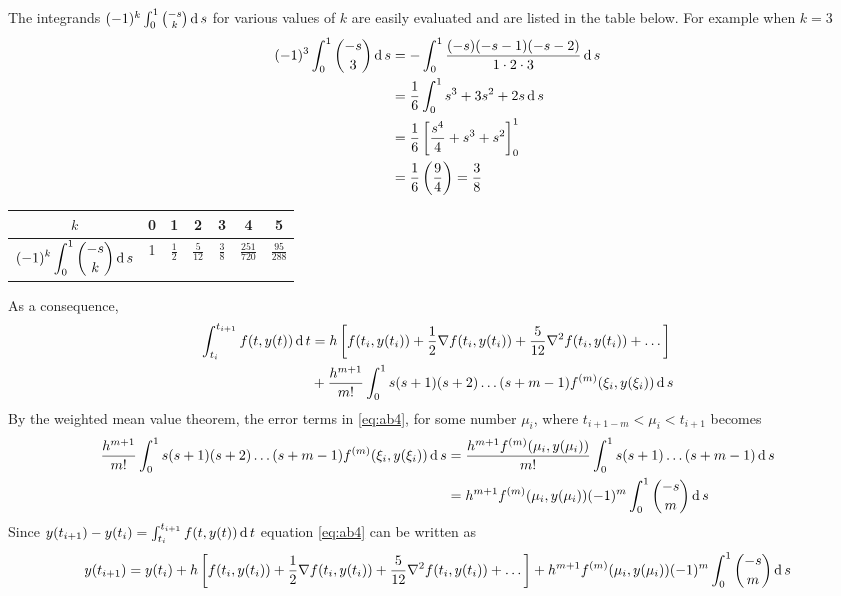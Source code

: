 \documentclass[../main-sheet.tex]{subfiles}
\begin{document}
The integrands \((-1)^k\int_{0}^{1}\binom{-s}{k}\,\mathrm{d}\, s\) for various values of \(k\) are easily evaluated and are listed in the table below. For example when \(k=3\)
\begin{align*}
    (-1)^3\int_{0}^{1}\binom{-s}{3}\,\mathrm{d}\, s&=-\int_{0}^{1}\frac{(-s)(-s-1)(-s-2)}{1\cdot2\cdot3}\,\mathrm{d}\, s\\
    &=\frac{1}{6}\int_{0}^{1} s^3+3s^2+2s \,\mathrm{d}\, s\\
    &=\frac{1}{6}\left[ \frac{s^4}{4}+s^3+s^2\right]_0^1\\
    &=\frac{1}{6}\left( \frac{9}{4} \right)=\frac{3}{8}
\end{align*}
\begin{table}[H]
    \centering
    \begin{tabular}{ccccccc}
        \toprule
        \(k\) & 0 & 1& 2& 3& 4&5\\\midrule
        \(\displaystyle (-1)^k\int_{0}^{1}\binom{-s}{k}\,\mathrm{d}\, s\) & 1 & \(\displaystyle\frac{1}{2}\)& \(\displaystyle\frac{5}{12}\)& \(\displaystyle\frac{3}{8}\)& \(\displaystyle\frac{251}{720}\)&\(\displaystyle\frac{95}{288}\)\\\bottomrule
    \end{tabular}
\end{table}
As a consequence,
\begin{align}
    \int_{t_i}^{t_{i+1}}f(t,y(t))\,\mathrm{d}\, t&=h\left[ f(t_i,y(t_i))+\frac{1}{2}\nabla f(t_i,y(t_i))+\frac{5}{12}\nabla^2 f(t_i,y(t_i))+\dots \right]\notag\\
    &+\frac{h^{m+1}}{m!}\int_{0}^{1}s(s+1)(s+2)\dots(s+m-1)f^{(m)}(\xi_i,y(\xi_i))\,\mathrm{d}\, s \label{eq:ab4}
\end{align}
By the weighted mean value theorem, the error terms in \eqref{eq:ab4}, for some number \(\mu_i\), where \(t_{i+1-m}<\mu_i<t_{i+1}\) becomes
\begin{align}
    \frac{h^{m+1}}{m!}\int_{0}^{1}s(s+1)(s+2)\dots(s+m-1)f^{(m)}(\xi_i,y(\xi_i))\,\mathrm{d}\, s&=\frac{h^{m+1}f^{(m)}(\mu_i,y(\mu_i))}{m!}\int_{0}^{1}s(s+1)\dots(s+m-1)\,\mathrm{d}\, s\notag\\
    &=h^{m+1}f^{(m)}(\mu_i,y(\mu_i))(-1)^m\int_{0}^{1}\binom{-s}{m}\,\mathrm{d}\, s\label{eq:ab5}
\end{align}
Since \(y(t_{i+1})-y(t_i)=\int_{t_i}^{t_{i+1}}f(t,y(t))\,\mathrm{d}\, t\) equation \eqref{eq:ab4} can be written as
\begin{equation}
    y(t_{i+1})=y(t_i)+h\left[f(t_i,y(t_i))+\frac{1}{2}\nabla f(t_i,y(t_i))+\frac{5}{12}\nabla^2 f(t_i,y(t_i))+\dots\right]+h^{m+1}f^{(m)}(\mu_i,y(\mu_i))(-1)^m\int_{0}^{1}\binom{-s}{m}\,\mathrm{d}\, s\label{eq:ab5.1}
\end{equation}
\end{document}
